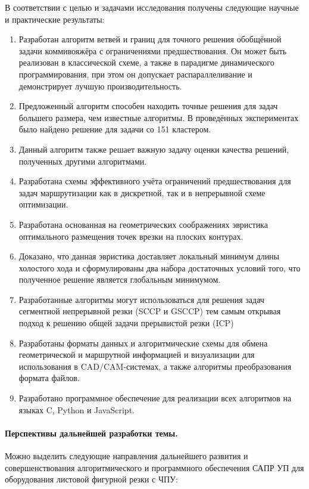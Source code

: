 В соответствии с целью и задачами исследования получены следующие
научные и практические результаты:

\begin{enumerate}
  \item
  Разработан алгоритм ветвей и границ для точного решения
  обобщённой задачи коммивояжёра с ограничениями предшествования.
  Он может быть реализован в классической схеме,
  а также в парадигме динамического программирования,
  при этом он допускает
  распараллеливание и демонстрирует лучшую производительность.
  \item
  Предложенный алгоритм способен находить точные решения для задач большего размера,
  чем известные алгоритмы.
  В проведённых экспериментах было найдено решение для
  задачи со 151 кластером.
  \item
  Данный алгоритм также решает важную задачу оценки качества
  решений, полученных другими алгоритмами.
  \item
  Разработана схемы эффективного учёта ограничений предшествования
  для задач маршрутизации как в дискретной,
  так и в непрерывной схеме оптимизации.
  \item
  Разработана основанная на геометрических соображениях эвристика
  оптимального размещения точек врезки на плоских контурах.
  \item
  Доказано, что данная эвристика доставляет локальный минимум длины холостого хода
  и сформулированы два набора достаточных условий того,
  что полученное решение является глобальным минимумом.
  \item
  Разработанные алгоритмы могут использоваться для
  решения задач сегментной непрерывной резки (SCCP и GSCCP)
  тем самым открывая подход к решению общей задачи прерывистой резки
  (ICP)
  \item
  Разработаны форматы данных
  и алгоритмические схемы
  для обмена геометрической и маршрутной
  информацией и визуализации для использования в CAD/CAM-системах,
  а также алгоритмы преобразования формата файлов.
  \item
  Разработано программное обеспечение для реализации всех алгоритмов
  на языках C, Python и JavaScript.
\end{enumerate}

\paragraph*{Перспективы дальнейшей разработки темы.}
Можно выделить следующие направления дальнейшего развития и совершенствования алгоритмического и
программного обеспечения САПР УП для оборудования листовой фигурной резки с ЧПУ:

